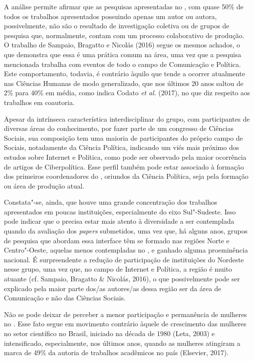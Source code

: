 A análise permite afirmar que as pesquisas apresentadas no , com quase
50\% de todos os trabalhos apresentados possuindo apenas um autor ou
autora, possivelmente, não são o resultado de investigação coletiva ou
de grupos de pesquisa que, normalmente, contam com um processo
colaborativo de produção. O trabalho de Sampaio, Bragatto e Nicolás
(2016) segue os mesmos achados, o que demonstra que essa é uma prática
comum na área, uma vez que a pesquisa mencionada trabalha com eventos de
todo o campo de Comunicação e Política. Este comportamento, todavia, é
contrário àquilo que tende a ocorrer atualmente nas Ciências Humanas de
modo generalizado, que nos últimos 20 anos saltou de 2\% para 40\% em
média, como indica Codato \emph{et al.} (2017), no que diz respeito aos
trabalhos em coautoria.

Apesar da intrínseca característica interdisciplinar do grupo, com
participantes de diversas áreas do conhecimento, por fazer parte de um
congresso de Ciências Sociais, sua composição tem uma maioria de
participantes do próprio campo de Sociais, notadamente da Ciência
Política, indicando um viés mais próximo dos estudos sobre Internet e
Política, como pode ser observado pela maior ocorrência de artigos de
Ciberpolítica. Esse perfil também pode estar associado à formação dos
primeiros coordenadores do , oriundos da Ciência Política, seja pela
formação ou área de produção atual.

Constata"-se, ainda, que houve uma grande concentração dos trabalhos
apresentados em poucas instituições, especialmente do eixo Sul"-Sudeste.
Isso pode indicar que o  precisa estar mais atento à diversidade a ser
contemplada quando da avaliação dos \emph{papers} submetidos, uma vez
que, há alguns anos, grupos de pesquisa que abordam essa interface têm
se formado nas regiões Norte e Centro"-Oeste, aquelas menos contempladas
no , e ganhado alguma proeminência nacional. É surpreendente a redução
de participação de instituições do Nordeste nesse grupo, uma vez que, no
campo de Internet e Política, a região é muito atuante (cf. Sampaio,
Bragatto \& Nicolás, 2016), o que possivelmente pode ser explicado pela
maior parte dos/as autores/as dessa região ser da área de Comunicação e
não das Ciências Sociais.

Não se pode deixar de perceber a menor participação e permanência de
mulheres no . Esse fato segue em movimento contrário àquele de
crescimento das mulheres no setor científico no Brasil, iniciado na
década de 1980 (Leta, 2003) e intensificado, especialmente, nos últimos
anos, quando as mulheres atingiram a marca de 49\% da autoria de
trabalhos acadêmicos no país (Elsevier, 2017).

